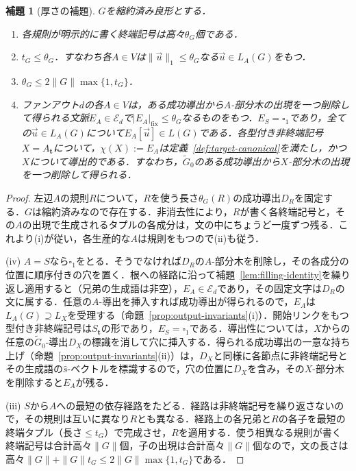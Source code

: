 \documentclass[11pt,a4paper]{ltjsarticle}
\numberwithin{equation}{section}
\theoremstyle{plain}
\newtheorem{lemma}[theorem]{補題}
\theoremstyle{definition}
\theoremstyle{remark}
\newcommand{\tuple}[1]{\vec{#1}}
\newcommand{\blank}{\square}
\begin{document}
\begin{lemma}[厚さの補題]
\label{lem:thickness-equivalence}
\label{lem:thickness-local-bounds}
\label{lem:untyped-contexts}
$G$を縮約済み良形とする．
\begin{enumerate}[label=\textup{(\roman*)},leftmargin=*]
\item 各規則が明示的に書く終端記号は高々$\theta_G$個である．
\item $t_G\le\theta_G$．すなわち各$A\in V$は$\|\tuple u\|_1\le\theta_G$なる$\tuple u\in L_A(G)$をもつ．
\item $\theta_G\le 2\|G\|\max\{1,t_G\}$．
\item ファンアウト$d$の各$A\in V$は，ある成功導出から$A$-部分木の出現を一つ削除して得られる文脈$E_A\in\mathcal E_d$で$|E_A|_{\mathrm{fix}}\le\theta_G$なるものをもつ．$E_S=\blank_1$であり，全ての$\tuple u\in L_A(G)$について$E_A[\tuple u]\in L(G)$である．各型付き非終端記号$X=A_{\mathbf t}$について，$\chi(X):=E_A$は定義~\ref{def:target-canonical}を満たし，かつ$X$について\emph{導出的}である．すなわち，$\widetilde G_0$のある成功導出から$X$-部分木の出現を一つ削除して得られる．
\end{enumerate}
\end{lemma}

\begin{proof}
左辺$A$の規則$R$について，$R$を使う長さ$\theta_G(R)$の成功導出$D_R$を固定する．$G$は縮約済みなので存在する．非消去性により，$R$が書く各終端記号と，その$A$の出現で生成されるタプルの各成分は，文の中にちょうど一度ずつ残る．これより(i)が従い，各生産的な$A$は規則をもつので(ii)も従う．

(iv) $A=S$なら$\blank_1$をとる．そうでなければ$D_R$の$A$-部分木を削除し，その各成分の位置に順序付きの穴を置く．根への経路に沿って補題~\ref{lem:filling-identity}を繰り返し適用すると（兄弟の生成語は非空），$E_A\in\mathcal E_d$であり，その固定文字は$D_R$の文に属する．任意の$A$-導出を挿入すれば成功導出が得られるので，$E_A$は$L_A(G)\supseteq L_X$を受理する（命題~\ref{prop:output-invariants}(i)）．開始リンクをもつ型付き非終端記号は$S_{\mathbf t}$の形であり，$E_S=\blank_1$である．導出性については，$X$からの任意の$\widetilde G_0$-導出$D_X$の標識を消して穴に挿入する．得られる成功導出の一意な持ち上げ（命題~\ref{prop:output-invariants}(ii)）は，$D_X$と同様に各節点に非終端記号とその生成語の$\widehat s$-ベクトルを標識するので，穴の位置に$D_X$を含み，その$X$-部分木を削除すると$E_A$が残る．

(iii) $S$から$A$への最短の依存経路をたどる．経路は非終端記号を繰り返さないので，その規則は互いに異なり$R$とも異なる．経路上の各兄弟と$R$の各子を最短の終端タプル（長さ$\le t_G$）で完成させ，$R$を適用する．使う相異なる規則が書く終端記号は合計高々$\|G\|$個，子の出現は合計高々$\|G\|$個なので，文の長さは高々$\|G\|+\|G\|t_G\le2\|G\|\max\{1,t_G\}$である．
\end{proof}
\end{document}
